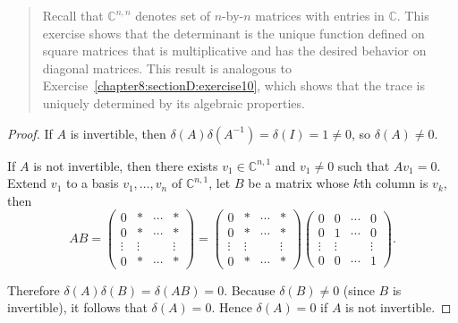 \begin{quote}
    Recall that $\mathbb{C}^{n,n}$ denotes set of $n$-by-$n$ matrices with entries in $\mathbb{C}$. This exercise shows that the determinant is the unique function defined on square matrices that is multiplicative and has the desired behavior on diagonal matrices. This result is analogous to Exercise~\ref{chapter8:sectionD:exercise10}, which shows that the trace is uniquely determined by its algebraic properties.
\end{quote}

\begin{proof}
    If $A$ is invertible, then $\delta(A)\delta(A^{-1}) = \delta(I) = 1\ne 0$, so $\delta(A)\ne 0$.

    If $A$ is not invertible, then there exists $v_{1}\in\mathbb{C}^{n,1}$ and $v_{1}\ne 0$ such that $Av_{1} = 0$. Extend $v_{1}$ to a basis $v_{1}, \ldots, v_{n}$ of $\mathbb{C}^{n,1}$, let $B$ be a matrix whose $k$th column is $v_{k}$, then
    \[
        AB = \begin{pmatrix}
            0      & *      & \cdots & *      \\
            0      & *      & \cdots & *      \\
            \vdots & \vdots &        & \vdots \\
            0      & *      & \cdots & *
        \end{pmatrix}
        =
        \begin{pmatrix}
            0      & *      & \cdots & *      \\
            0      & *      & \cdots & *      \\
            \vdots & \vdots &        & \vdots \\
            0      & *      & \cdots & *
        \end{pmatrix}
        \begin{pmatrix}
            0      & 0      & \cdots & 0      \\
            0      & 1      & \cdots & 0      \\
            \vdots & \vdots &        & \vdots \\
            0      & 0      & \cdots & 1
        \end{pmatrix}.
    \]

    Therefore $\delta(A)\delta(B) = \delta(AB) = 0$. Because $\delta(B)\ne 0$ (since $B$ is invertible), it follows that $\delta(A) = 0$. Hence $\delta(A) = 0$ if $A$ is not invertible.


\end{proof}
